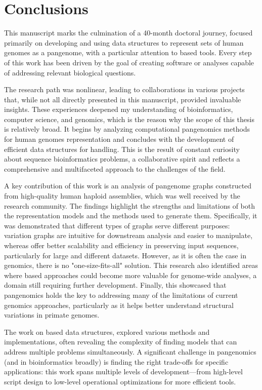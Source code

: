 \chapter{Conclusions}
\label{sec:conclusions}
This manuscript marks the culmination of a 40-month doctoral journey, focused primarily on developing and using data structures to represent sets of human genomes as a pangenome, with a particular attention to \kmer based tools. Every step of this work has been driven by the goal of creating software or analyses capable of  addressing relevant biological questions.

The research path was nonlinear, leading to collaborations in various projects that, while not all directly presented in this manuscript, provided invaluable insights. These experiences deepened my understanding of bioinformatics, computer science, and genomics, which is the reason why the scope of this thesis is relatively broad. It begins by analyzing computational pangenomics methods for human genomes representation and concludes with the development of efficient data structures for \kmer handling. This is the result of constant curiosity about sequence bioinformatics problems, a collaborative spirit and reflects a comprehensive and multifaceted approach to the challenges of the field.

A key contribution of this work is an analysis of pangenome graphs constructed from high-quality human haploid assemblies, which was well received by the research community. The findings highlight the strengths and limitations of both the representation models and the methods used to generate them. Specifically, it was demonstrated that different types of graphs serve different purposes: variation graphs are intuitive for downstream analysis and easier to manipulate, whereas \dbgs offer better scalability and efficiency in preserving input sequences, particularly for large and different datasets. However, as it is often the case in genomics, there is no "one-size-fits-all" solution. This research also identified areas where \kmer based approaches could become more valuable for genome-wide analyses, a domain still requiring further development. Finally, this showcased that pangenomics holds the key to addressing many of the limitations of current genomics approaches, particularly as it helps better understand structural variations in primate genomes.

The work on \kmer based data structures, explored various methods and implementations, often revealing the complexity of finding models that can address multiple problems simultaneously. A significant challenge in pangenomics (and in bioinformatics broadly) is finding the right trade-offs for specific applications: this work spans multiple levels of development—from high-level script design to low-level operational optimizations for more efficient tools.

